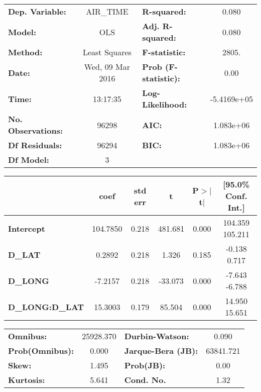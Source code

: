 \begin{center}
\begin{tabular}{lclc}
\toprule
\textbf{Dep. Variable:}    &     AIR_TIME     & \textbf{  R-squared:         } &      0.080   \\
\textbf{Model:}            &       OLS        & \textbf{  Adj. R-squared:    } &      0.080   \\
\textbf{Method:}           &  Least Squares   & \textbf{  F-statistic:       } &      2805.   \\
\textbf{Date:}             & Wed, 09 Mar 2016 & \textbf{  Prob (F-statistic):} &      0.00    \\
\textbf{Time:}             &     13:17:35     & \textbf{  Log-Likelihood:    } & -5.4169e+05  \\
\textbf{No. Observations:} &       96298      & \textbf{  AIC:               } &  1.083e+06   \\
\textbf{Df Residuals:}     &       96294      & \textbf{  BIC:               } &  1.083e+06   \\
\textbf{Df Model:}         &           3      & \textbf{                     } &              \\
\bottomrule
\end{tabular}
\begin{tabular}{lccccc}
                      & \textbf{coef} & \textbf{std err} & \textbf{t} & \textbf{P$>$$|$t$|$} & \textbf{[95.0\% Conf. Int.]}  \\
\midrule
\textbf{Intercept}    &     104.7850  &        0.218     &   481.681  &         0.000        &       104.359   105.211       \\
\textbf{D_LAT}        &       0.2892  &        0.218     &     1.326  &         0.185        &        -0.138     0.717       \\
\textbf{D_LONG}       &      -7.2157  &        0.218     &   -33.073  &         0.000        &        -7.643    -6.788       \\
\textbf{D_LONG:D_LAT} &      15.3003  &        0.179     &    85.504  &         0.000        &        14.950    15.651       \\
\bottomrule
\end{tabular}
\begin{tabular}{lclc}
\textbf{Omnibus:}       & 25928.370 & \textbf{  Durbin-Watson:     } &     0.090  \\
\textbf{Prob(Omnibus):} &    0.000  & \textbf{  Jarque-Bera (JB):  } & 63841.721  \\
\textbf{Skew:}          &    1.495  & \textbf{  Prob(JB):          } &      0.00  \\
\textbf{Kurtosis:}      &    5.641  & \textbf{  Cond. No.          } &      1.32  \\
\bottomrule
\end{tabular}
\end{center}